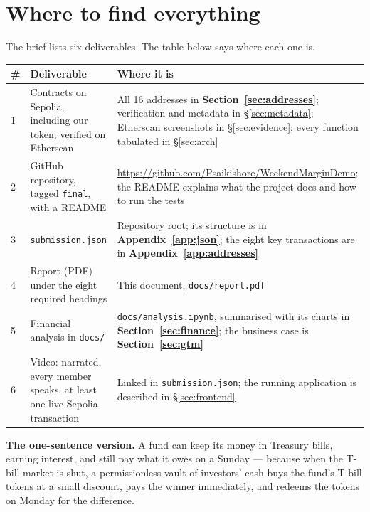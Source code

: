 \documentclass[11pt,a4paper]{article}
\newcommand{\cbox}[1]{%
  \begin{center}\colorbox{panel}{\parbox{0.95\textwidth}{\vspace{3pt}#1\vspace{3pt}}}\end{center}}
\begin{document}
\section*{Where to find everything}

The brief lists six deliverables. The table below says where each one is.

\begin{center}
\small
\begin{tabular}{@{}p{0.6cm}p{4.6cm}p{10.6cm}@{}}
\toprule
\textbf{\#} & \textbf{Deliverable} & \textbf{Where it is} \\
\midrule
1 & Contracts on Sepolia, including our token, verified on Etherscan & All 16 addresses in \textbf{Section~\ref{sec:addresses}}; verification and metadata in \S\ref{sec:metadata}; Etherscan screenshots in \S\ref{sec:evidence}; every function tabulated in \S\ref{sec:arch} \\
2 & GitHub repository, tagged \texttt{final}, with a README & \url{https://github.com/Psaikishore/WeekendMarginDemo}; the README explains what the project does and how to run the tests \\
3 & \texttt{submission.json} & Repository root; its structure is in \textbf{Appendix~\ref{app:json}}; the eight key transactions are in \textbf{Appendix~\ref{app:addresses}} \\
4 & Report (PDF) under the eight required headings & This document, \texttt{docs/report.pdf} \\
5 & Financial analysis in \texttt{docs/} & \texttt{docs/analysis.ipynb}, summarised with its charts in \textbf{Section~\ref{sec:finance}}; the business case is \textbf{Section~\ref{sec:gtm}} \\
6 & Video: narrated, every member speaks, at least one live Sepolia transaction & Linked in \texttt{submission.json}; the running application is described in \S\ref{sec:frontend} \\
\bottomrule
\end{tabular}
\end{center}

\vspace{6pt}
\cbox{\textbf{The one-sentence version.} A fund can keep its money in Treasury bills, earning
interest, and still pay what it owes on a Sunday — because when the T-bill
market is shut, a permissionless vault of investors' cash buys the fund's T-bill tokens at a small
discount, pays the winner immediately, and redeems the tokens on Monday for the difference.}
\end{document}
